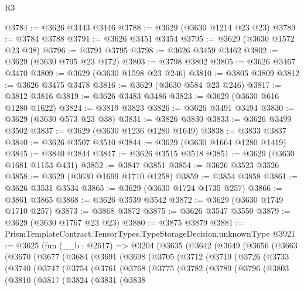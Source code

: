 \begin{lexlean}{R3}
\begin{coremodule}
@3784 := @3626 @3443 @3446
@3788 := @3629 (@3630 @1214 @23 @23)
@3789 := @3784 @3788
@3791 := @3626 @3451 @3454
@3795 := @3629 (@3630 @1572 @23 @38)
@3796 := @3791 @3795
@3798 := @3626 @3459 @3462
@3802 := @3629 (@3630 @795 @23 @172)
@3803 := @3798 @3802
@3805 := @3626 @3467 @3470
@3809 := @3629 (@3630 @1598 @23 @246)
@3810 := @3805 @3809
@3812 := @3626 @3475 @3478
@3816 := @3629 (@3630 @584 @23 @246)
@3817 := @3812 @3816
@3819 := @3626 @3483 @3486
@3823 := @3629 (@3630 @616 @1280 @1622)
@3824 := @3819 @3823
@3826 := @3626 @3491 @3494
@3830 := @3629 (@3630 @573 @23 @38)
@3831 := @3826 @3830
@3833 := @3626 @3499 @3502
@3837 := @3629 (@3630 @1236 @1280 @1649)
@3838 := @3833 @3837
@3840 := @3626 @3507 @3510
@3844 := @3629 (@3630 @1664 @1280 @1419)
@3845 := @3840 @3844
@3847 := @3626 @3515 @3518
@3851 := @3629 (@3630 @1681 @1153 @431)
@3852 := @3847 @3851
@3854 := @3626 @3523 @3526
@3858 := @3629 (@3630 @1699 @1710 @1258)
@3859 := @3854 @3858
@3861 := @3626 @3531 @3534
@3865 := @3629 (@3630 @1724 @1735 @257)
@3866 := @3861 @3865
@3868 := @3626 @3539 @3542
@3872 := @3629 (@3630 @1749 @1710 @257)
@3873 := @3868 @3872
@3875 := @3626 @3547 @3550
@3879 := @3629 (@3630 @1767 @23 @23)
@3880 := @3875 @3879
@3881 := PrismTemplateContract.TensorTypes.TypeStorageDecision.unknownType
@3921 := @3625
    (fun (__b : @2617) =>
    @3204
      (@3635
        (@3642
          (@3649
            (@3656
              (@3663
                (@3670
                  (@3677
                    (@3684
                      (@3691
                        (@3698
                          (@3705
                            (@3712
                              (@3719
                                (@3726
                                  (@3733
                                    (@3740
                                      (@3747
                                        (@3754
                                          (@3761
                                            (@3768
                                              (@3775
                                                (@3782
                                                  (@3789
                                                    (@3796
                                                      (@3803
                                                        (@3810
                                                          (@3817
                                                            (@3824
                                                              (@3831
                                                                (@3838

\end{coremodule}
\end{lexlean}

